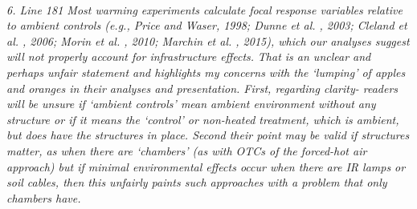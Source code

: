 \documentclass[11pt,a4paper]{letter}
\begin{document}
\begin{letter}{}
\\
\par \emph{6. Line 181 Most warming experiments calculate focal response variables relative to ambient controls (e.g., Price and Waser, 1998; Dunne et al. , 2003; Cleland et al. , 2006; Morin et al. , 2010; Marchin et al. , 2015), which our analyses suggest will not properly account for infrastructure effects.}
\emph{That is an unclear and perhaps unfair statement and highlights my concerns with the `lumping' of apples and oranges in their analyses and presentation. First, regarding clarity- readers will be unsure if `ambient controls' mean ambient environment without any structure or if it means the `control' or non-heated treatment, which is ambient, but does have the structures in place. Second their point may be valid if structures matter, as when there are `chambers' (as with OTCs of the forced-hot air approach) but if minimal environmental effects occur when there are IR lamps or soil cables, then this unfairly paints such approaches with a problem that only chambers have.}


\end{letter}
\end{document}

